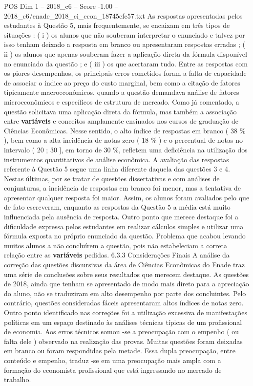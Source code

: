 \begin{textsample}{POS Dim 1 – 2018\_c6 – Score -1.00 – 2018\_c6/enade\_2018\_ci\_econ\_18745efc57.txt}
As respostas apresentadas pelos estudantes à Questão 5, mais frequentemente, se encaixam em três tipos de situações : ( i ) os alunos que não souberam interpretar o enunciado e talvez por isso tenham deixado a resposta em branco ou apresentaram respostas erradas ; ( ii ) os alunos que apenas souberam fazer a aplicação direta da fórmula disponível no enunciado da questão ; e ( iii ) os que acertaram tudo.
Entre as respostas com os piores desempenhos, os principais erros cometidos foram a falta de capacidade de associar o índice ao preço do custo marginal, bem como a citação de fatores tipicamente macroeconômicos, quando a questão demandava análise de fatores microeconômicos e específicos de estrutura de mercado.
Como já comentado, a questão solicitava uma aplicação direta da fórmula, mas também a associação entre \textbf{variáveis} e conceitos amplamente ensinados nos cursos de graduação de Ciências Econômicas.
Nesse sentido, o alto índice de respostas em branco ( 38 \% ), bem como a alta incidência de notas zero ( 18 \% ) e o percentual de notas no intervalo ( 20 ; 30 ], em torno de 30 \%, refletem uma deficiência na utilização dos instrumentos quantitativos de análise econômica.
A avaliação das respostas referente à Questão 5 segue uma linha diferente daquela das questões 3 e 4.
Nestas últimas, por se tratar de questões dissertativas e com análises de conjunturas, a incidência de respostas em branco foi menor, mas a tentativa de apresentar qualquer resposta foi maior.
Assim, os alunos foram avaliados pelo que de fato escreveram, enquanto as respostas da Questão 5 a média está muito influenciada pela ausência de resposta.
Outro ponto que merece destaque foi a dificuldade expressa pelos estudantes em realizar cálculos simples e utilizar uma fórmula exposta no próprio enunciado da questão.
Problema que acabou levando muitos alunos a não concluírem a questão, pois não estabeleciam a correta relação entre as \textbf{variáveis} pedidas. 6.3.3 Considerações Finais A análise da correção das questões discursivas da área de Ciências Econômicas do Enade traz uma série de conclusões sobre seus resultados que merecem destaque.
As questões de 2018, ainda que tenham se apresentado de modo mais direto para a apreciação do aluno, não se traduziram em alto desempenho por parte dos concluintes.
Pelo contrário, questões consideradas fáceis apresentaram altos índices de notas zero.
Outro ponto identificado nas correções foi a utilização excessiva de manifestações políticas em um espaço destinado às análises técnicas típicas de um profissional de economia.
Aos erros técnicos somou -se a preocupação com o empenho ( ou falta dele ) observado na realização das provas.
Muitas questões foram deixadas em branco ou foram respondidas pela metade.
Essa dupla preocupação, entre conteúdo e empenho, traduz -se em uma preocupação mais ampla com a formação do economista profissional que está ingressando no mercado de trabalho.

\end{textsample}
